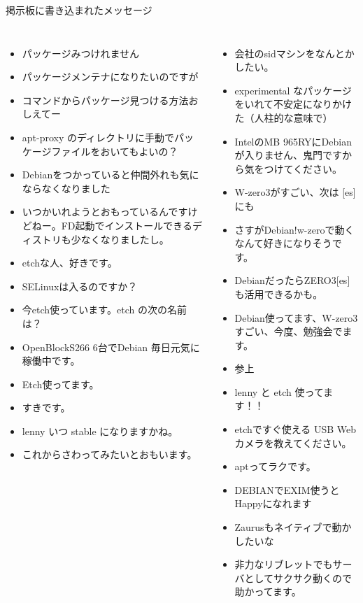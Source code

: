 \documentclass[cjk,dvipdfmx,12pt]{beamer}
\begin{document}
\begin{frame}{掲示板に書き込まれたメッセージ}

{\tiny
\begin{columns}%
\column{0.5\hsize}
 \begin{itemize}
    \item パッケージみつけれません
    \item パッケージメンテナになりたいのですが
    \item コマンドからパッケージ見つける方法おしえてー
    \item apt-proxy のディレクトリに手動でパッケージファイルをおいてもよいの？
    \item Debianをつかっていると仲間外れも気にならなくなりました
    \item いつかいれようとおもっているんですけどねー。FD起動でインストールできるディストリも少なくなりましたし。
    \item etchな人、好きです。
    \item SELinuxは入るのですか？
    \item 今etch使っています。etch の次の名前は？
    \item OpenBlockS266 6台でDebian 毎日元気に稼働中です。
    \item Etch使ってます。
    \item すきです。
    \item lenny いつ stable になりますかね。
    \item これからさわってみたいとおもいます。
\end{itemize}
\column{0.5\hsize}
\begin{itemize}
    \item 会社のsidマシンをなんとかしたい。
    \item experimental なパッケージをいれて不安定になりかけた（人柱的な意味で）
    \item IntelのMB 965RYにDebianが入りません、鬼門ですから気をつけてください。
    \item W-zero3がすごい、次は [es] にも
    \item さすがDebian!w-zeroで動くなんて好きになりそうです。
    \item DebianだったらZERO3[es]も活用できるかも。
    \item Debian使ってます、W-zero3すごい、今度、勉強会でます。
    \item 参上
    \item lenny と etch 使ってます！！
    \item etchですぐ使える USB Web カメラを教えてください。
    \item aptってラクです。
    \item DEBIANでEXIM使うとHappyになれます
    \item Zaurusもネイティブで動かしたいな
    \item 非力なリブレットでもサーバとしてサクサク動くので助かってます。
 \end{itemize}
\end{columns}
}
\end{frame}
\end{document}
